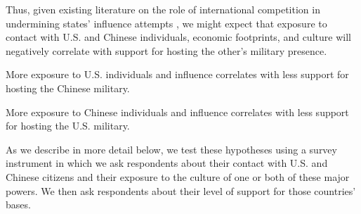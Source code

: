 Thus, given existing literature on the role of international competition in undermining states' influence attempts \cite{joyce2023}, we might expect that exposure to contact with U.S. and Chinese individuals, economic footprints, and culture will negatively correlate with support for hosting the other's military presence.

\begin{subhyp}
	
	\begin{hyp}
		More exposure to U.S. individuals and influence correlates with less support for hosting the Chinese military.
	\end{hyp}
	
	\begin{hyp}
		More exposure to Chinese individuals and influence correlates with less support for hosting the U.S. military.
	\end{hyp}
	
\end{subhyp}


As we describe in more detail below, we test these hypotheses using a survey instrument in which we ask respondents about their contact with U.S. and Chinese citizens and their exposure to the culture of one or both of these major powers. We then ask respondents about their level of support for those countries' bases.







